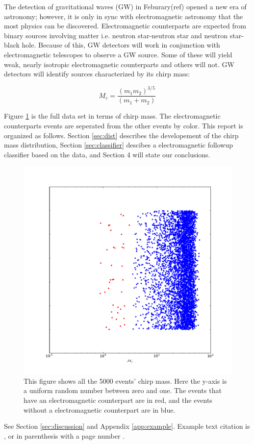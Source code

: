 The detection of gravitational waves (GW) in Feburary(ref) opened a new era of astronomy; however, it is only in sync with electromagnetic astronomy that the most physics can be discovered. Electromagnetic counterparts are expected from binary sources involving matter i.e. neutron star-neutron star and neutron star-black hole. Because of this, GW detectors will work in conjunction with electromagnetic telescopes to observe a GW source. Some of these will yield weak, nearly isotropic electromagnetic counterparts and others will not. GW detectors will identify sources characterized by its chirp mass:

\begin{equation}
M_{c}=\frac{(m_{1}m_{2})^{3/5}}{(m_{1}+m_{2})}
\end{equation}

Figure \ref{fig:chirp} is the full data set in terms of chirp mass. The electromagnetic counterparts events are seperated from the other events by color. This report is organized as follows. Section \ref{sec:dist} describes the developement of the chirp mass distribution, Section \ref{sec:classifier} descibes a electromagnetic followup classifier based on the data, and Section 4 will state our conclusions.
\begin{figure}
\includegraphics[width=\columnwidth]{output/jake/chirp-mass-classes.pdf}
\caption{This figure shows all the 5000 events' chirp mass. Here the y-axis is a uniform random number between zero and one. The events that have an electromagnetic counterpart are in red, and the events without a electromagnetic counterpart are in blue.}
\label{fig:chirp}
\end{figure}
See Section \ref{sec:discussion} and Appendix \ref{app:example}. Example text citation is \textcite{2012ApJ...759...52D}, or in parenthesis with a page number \parencite[pg 2]{2012ApJ...759...52D}.

